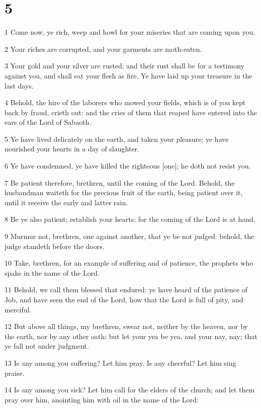 \chapter{5}

\par 1 Come now, ye rich, weep and howl for your miseries that are coming upon you.
\par 2 Your riches are corrupted, and your garments are moth-eaten.
\par 3 Your gold and your silver are rusted; and their rust shall be for a testimony against you, and shall eat your flesh as fire. Ye have laid up your treasure in the last days.
\par 4 Behold, the hire of the laborers who mowed your fields, which is of you kept back by fraud, crieth out: and the cries of them that reaped have entered into the ears of the Lord of Sabaoth.
\par 5 Ye have lived delicately on the earth, and taken your pleasure; ye have nourished your hearts in a day of slaughter.
\par 6 Ye have condemned, ye have killed the righteous [one]; he doth not resist you.
\par 7 Be patient therefore, brethren, until the coming of the Lord. Behold, the husbandman waiteth for the precious fruit of the earth, being patient over it, until it receive the early and latter rain.
\par 8 Be ye also patient; establish your hearts: for the coming of the Lord is at hand.
\par 9 Murmur not, brethren, one against another, that ye be not judged: behold, the judge standeth before the doors.
\par 10 Take, brethren, for an example of suffering and of patience, the prophets who spake in the name of the Lord.
\par 11 Behold, we call them blessed that endured: ye have heard of the patience of Job, and have seen the end of the Lord, how that the Lord is full of pity, and merciful.
\par 12 But above all things, my brethren, swear not, neither by the heaven, nor by the earth, nor by any other oath: but let your yea be yea, and your nay, nay; that ye fall not under judgment.
\par 13 Is any among you suffering? Let him pray. Is any cheerful? Let him sing praise.
\par 14 Is any among you sick? Let him call for the elders of the church; and let them pray over him, anointing him with oil in the name of the Lord:
